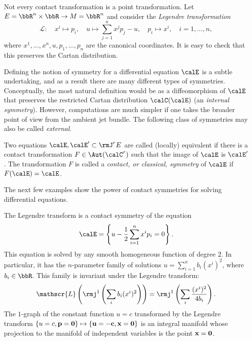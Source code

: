 \begin{example}
    Not every contact transformation is a point transformation. Let $E=\bbR^n\times \bbR\to M=\bbR^n$ and consider the \emph{Legendre transformation} 
    \[\mathscr{L}:\quad x^i\mapsto p_i,\quad u\mapsto \sum_{j=1}^n x^jp_j-u,\quad p_i\mapsto x^i,\quad i=1,\ldots,n,\]
    where $x^1,\ldots,x^n,u,p_1,\ldots,p_n$ are the canonical coordinates. It is easy to check that this preserves the Cartan distribution.
\end{example}

Defining the notion of symmetry for a differential equation $\calE$ is a subtle undertaking, and as a result there are many different types of symmetries. Conceptually, the most natural definition would be as a diffeomorphism of $\calE$ that preserves the restricted Cartan distribution $\calC(\calE)$ (an \emph{internal symmetry}). However, computations are much simpler if one takes the broader point of view from the ambient jet bundle. The following class of symmetries may also be called \emph{external}.

\begin{defn}
    Two equations $\calE,\calE'\subset\rmJ^r E$ are called (locally) equivalent if there is a contact transformation $F\in\Aut(\calC^r)$ such that the image of $\calE$ is $\calE'$. The transformation $F$ is called a \emph{contact, or classical, symmetry} of $\calE$ if $F(\calE)=\calE$.
\end{defn}

The next few examples show the power of contact symmetries for solving differential equations.

\begin{example}
    The Legendre transform is a contact symmetry of the equation 
    \[\calE=\left\{u-\frac12\sum_{i=1}^n x^ip_i=0\right\}.\]
    This equation is solved by any smooth homogeneous function of degree $2$. In particular, it has the $n$-parameter family of solutions $u=\sum_{i=1}^n b_i(x^i)^2$, where $b_i\in\bbR$. This family is invariant under the Legendre transform:
    \[\mathscr{L}\left(\rmj^1\left(\sum_i b_i(x^i)^2\right)\right)=\rmj^1\left(\sum_i \frac{(x^i)^2}{4b_i}\right).\]
    The $1$-graph of the constant function $u=c$ transformed by the Legendre transform $\{u=c,\bf{p}=0\}\mapsto \{u=-c,\bf{x}=0\}$ is an integral manifold whose projection to the manifold of independent variables is the point $\bf{x}=0$.
\end{example}

